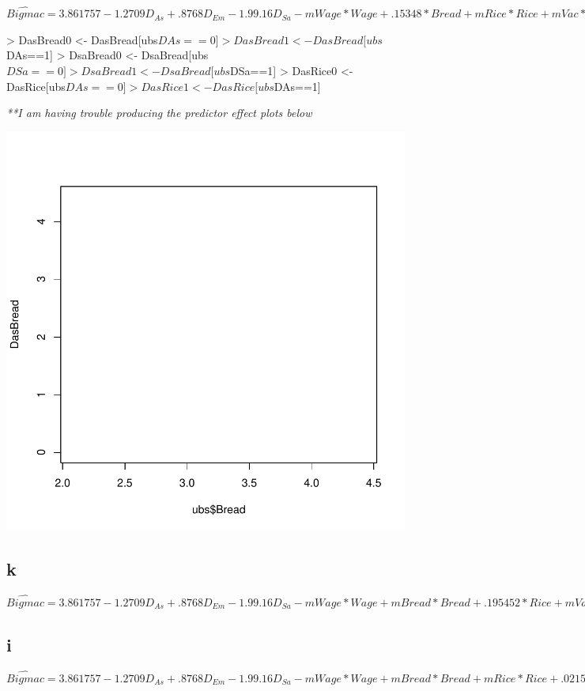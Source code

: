 \documentclass{article}
\begin{document}
$\hat{Bigmac}=3.861757-1.2709D_{As}+.8768D_{Em}-1.99.16D_{Sa}-mWage*Wage+.15348*Bread+mRice*Rice+mVac*Vac+.15348*DasBread-mRice*DasRice+mVac*DasVac-mVac*DemVac+.15348*DsaBread$
\\
\begin{Schunk}
\begin{Sinput}
> DasBread0 <- DasBread[ubs$DAs==0]
> DasBread1 <- DasBread[ubs$DAs==1]
> DsaBread0 <- DsaBread[ubs$DSa==0]
> DsaBread1 <- DsaBread[ubs$DSa==1]
> DasRice0 <- DasRice[ubs$DAs==0]
> DasRice1 <- DasRice[ubs$DAs==1]
\end{Sinput}
\end{Schunk}



\it{**I am having trouble producing the predictor effect plots below}

\begin{Schunk}
\end{Schunk}
\includegraphics{RegressionFinal-016}

\subsection*{k}
$=3.861757-1.2709D_{As}+.8768D_{Em}-1.99.16D_{Sa}-mWage*Wage+mBread*Bread+.195452*Rice+mVac*Vac+mBread*DasBread-.195452*DasRice+mVac*DasVac-mVac*DemVac+mBread*DsaBread$


\subsection*{i}
$=3.861757-1.2709D_{As}+.8768D_{Em}-1.99.16D_{Sa}-mWage*Wage+mBread*Bread+mRice*Rice+.021595*Vac+mBread*DasBread-mRice*DasRice+.021595*DasVac-.021595*DemVac+mBread*DsaBread$
\end{document}
